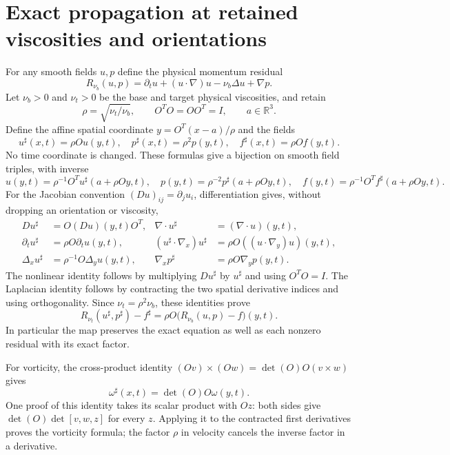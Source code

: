\documentclass[11pt]{article}
\begin{document}
\section{Exact propagation at retained viscosities and orientations}
\label{nsprop:map}
For any smooth fields $u,p$ define the physical momentum residual
\[
 R_{\nu_b}(u,p)=\partial_tu+(u\cdot\nabla)u-\nu_b\Delta u+\nabla p.
\]
Let $\nu_b>0$ and $\nu_t>0$ be the base and target physical viscosities,
and retain
\[
 \rho=\sqrt{\nu_t/\nu_b},\qquad O^TO=OO^T=I,\qquad a\in\mathbb R^3.
\]
Define the affine spatial coordinate $y=O^T(x-a)/\rho$ and the fields
\begin{equation}
 u^\sharp(x,t)=\rho O u(y,t),\quad
 p^\sharp(x,t)=\rho^2p(y,t),\quad
 f^\sharp(x,t)=\rho O f(y,t).
 \label{nsprop:affine_map}
\end{equation}
No time coordinate is changed. These formulas give a bijection on smooth
field triples, with inverse
\[
 u(y,t)=\rho^{-1}O^Tu^\sharp(a+\rho Oy,t),\quad
 p(y,t)=\rho^{-2}p^\sharp(a+\rho Oy,t),\quad
 f(y,t)=\rho^{-1}O^Tf^\sharp(a+\rho Oy,t).
\]
For the Jacobian convention $(Du)_{ij}=\partial_j u_i$, differentiation
gives, without dropping an orientation or viscosity,
\begin{align*}
 Du^\sharp&=O(Du)(y,t)O^T,&
 \nabla\cdot u^\sharp&=(\nabla\cdot u)(y,t),\\
 \partial_tu^\sharp&=\rho O\partial_tu(y,t),&
 (u^\sharp\cdot\nabla_x)u^\sharp&=\rho O((u\cdot\nabla_y)u)(y,t),\\
 \Delta_xu^\sharp&=\rho^{-1}O\Delta_yu(y,t),&
 \nabla_xp^\sharp&=\rho O\nabla_yp(y,t).
\end{align*}
The nonlinear identity follows by multiplying $Du^\sharp$ by
$u^\sharp$ and using $O^TO=I$. The Laplacian identity follows by
contracting the two spatial derivative indices and using orthogonality.
Since $\nu_t=\rho^2\nu_b$, these identities prove
\begin{equation}
 R_{\nu_t}(u^\sharp,p^\sharp)-f^\sharp
       =\rho O\bigl(R_{\nu_b}(u,p)-f\bigr)(y,t).
 \label{nsprop:residual_map}
\end{equation}
In particular the map preserves the exact equation as well as each
nonzero residual with its exact factor.

For vorticity, the cross-product identity
$(Ov)\times(Ow)=\det(O)O(v\times w)$ gives
\begin{equation}
 \omega^\sharp(x,t)=\det(O)O\omega(y,t).
 \label{nsprop:vorticity}
\end{equation}
One proof of this identity takes its scalar product with $Oz$:
both sides give $\det(O)\det[v,w,z]$ for every $z$. Applying it to
the contracted first derivatives proves the vorticity formula; the
factor $\rho$ in velocity cancels the inverse factor in a derivative.
\end{document}
